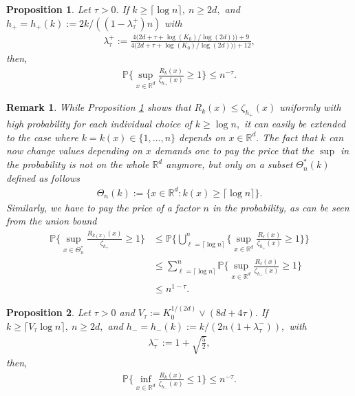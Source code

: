\documentclass[10pt,a4paper]{amsart}
\newtheorem{proposition}{Proposition}
\newtheorem{remark}{Remark}
\newcommand{\PP}{\mathbb{P}}
\newcommand{\RR}{\mathbb{R}}
\begin{document}
\begin{proposition}
    \label{prop.neighbours.distance.bound.zeta}
    Let $\tau > 0.$ If $k \geq \lceil \log n\rceil, \ n \geq 2d,$ and $h_+ = h_+(k) := 2k/((1 - \lambda^+_\tau)n)$ with
    \begin{align*}
        \lambda_\tau^+ := \frac{4\big(2d + \tau + \log(K_0)/\log(2d))\big) + 9}{4\big(2d + \tau + \log(K_0)/\log(2d))\big) + 12},
    \end{align*} 
    then,
    \begin{align*}
        \PP\Bigg\{\sup_{x \in \RR^d}\frac{R_k(x)}{\zeta_{h_+}(x)} \geq 1\Bigg\} \leq n^{-\tau}.
    \end{align*}
\end{proposition}

\begin{remark}
    \label{rem.bound.variable.k}
    While Proposition \ref{prop.neighbours.distance.bound.zeta} shows that $R_k(x) \leq \zeta_{h_+}(x)$ uniformly with high probability for each individual choice of $k \geq \log n,$ it can easily be extended to the case where $k = k(x) \in \{1, \dots, n\}$ depends on $x \in \RR^d.$ The fact that $k$ can now change values depending on $x$ demands one to pay the price that the $\sup$ in the probability is not on the whole $\RR^d$ anymore, but only on a subset $\Theta_n^*(k)$ defined as follows
    \begin{align*}
        \Theta_n(k) := \bigg\{x \in \RR^d: k(x) \geq \lceil\log n \rceil\bigg\}.
    \end{align*}
    Similarly, we have to pay the price of a factor $n$ in the probability, as can be seen from the union bound
    \begin{align*}
        \PP\Bigg\{\sup_{x \in \Theta_n^*}\frac{R_{k(x)}(x)}{\zeta_{h_+}} \geq 1\Bigg\} &\leq \PP\Bigg\{\bigcup_{\ell = \lceil \log n \rceil}^n\Bigg\{\sup_{x \in \RR^d}\frac{R_{\ell}(x)}{\zeta_{h_+}(x)} \geq 1\Bigg\} \Bigg\}\\
        &\leq \sum_{\ell = \lceil \log n \rceil}^n\PP\Bigg\{\sup_{x \in \RR^d}\frac{R_{\ell}(x)}{\zeta_{h_+}(x)}\geq 1\Bigg\}\\
        &\leq n^{1 - \tau}.
    \end{align*}
\end{remark}

\begin{proposition}
    \label{prop.neighbours.distance.lower.bound.zeta}
    Let $\tau > 0$ and $V_\tau := K_0^{1/(2d)}\vee(8d + 4\tau).$ If $k \geq \lceil V_\tau\log n\rceil, \ n\geq 2d,$ and $h_- = h_-(k) := k/(2n(1 + \lambda_\tau^-)),$ with 
    \begin{align*}
        \lambda_\tau^- := 1 + \sqrt{\frac 52},
    \end{align*}
    then,
    \begin{align*}
        \PP\Bigg\{\inf_{x \in \RR^d}\frac{R_k(x)}{\zeta_{h_-}(x)} \leq 1\Bigg\} \leq n^{-\tau}.
    \end{align*}
\end{proposition}
\end{document}
